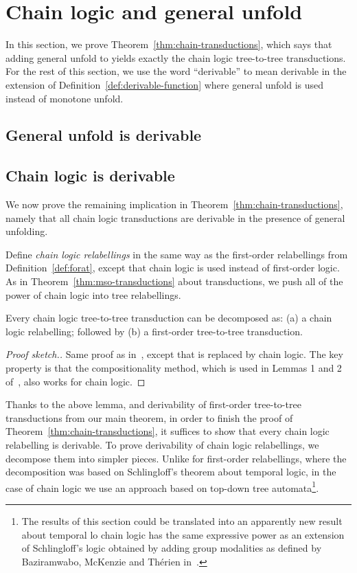 \section{Chain logic and general unfold}
\label{sec:appendix-chain}
In this section, we prove Theorem~\ref{thm:chain-transductions}, which says that adding general unfold to \mso yields exactly the chain logic tree-to-tree transductions. For the rest of this section, we use the word ``derivable'' to mean derivable in the extension of Definition~\ref{def:derivable-function} where general unfold is used instead of monotone unfold. 

\subsection{General unfold is derivable}


\subsection{Chain logic is derivable}
\label{sec:derive-chain-relabellings}
We now prove the remaining implication in Theorem~\ref{thm:chain-transductions}, namely that all chain logic transductions are derivable in the presence of general unfolding. 

Define  \emph{chain logic relabellings} in the same way as the first-order relabellings from Definition~\ref{def:forat}, except that chain logic is used instead of first-order logic.   As in Theorem~\ref{thm:mso-transductions} about \mso transductions, we push all of the power of chain logic into  tree relabellings.

\begin{lemma}\label{lem:chain-colcombet}
    Every   chain logic tree-to-tree transduction can be decomposed as: (a) a chain logic relabelling; followed by (b) a first-order tree-to-tree transduction. 
\end{lemma}
\begin{proof}[Proof sketch.]
    Same proof as in~\cite[Corollary 1]{colcombetCombinatorialTheoremTrees2007}, except that \mso is replaced  by chain logic. The key property is that the compositionality method, which is used in Lemmas 1 and 2 of~\cite{colcombetCombinatorialTheoremTrees2007},  also works for chain logic. 
\end{proof}

Thanks to the above lemma, and derivability of first-order tree-to-tree transductions from our main theorem, 
in order to finish the proof of Theorem~\ref{thm:chain-transductions}, it suffices to show that every chain logic relabelling is derivable.  
To prove derivability of chain logic relabellings, we  decompose them into simpler pieces. Unlike for first-order relabellings, where the decomposition was based on Schlingloff's theorem about temporal logic, in the case of chain logic we use an approach based on top-down tree automata\footnote{The results of this section could be translated into an apparently new result about temporal lo chain logic has the same expressive power as an  extension of Schlingloff's logic obtained by adding group modalities as defined by Baziramwabo, McKenzie and  Th{\'e}rien in~\cite[Section 4]{baziramwabo1999modular}.}. 

